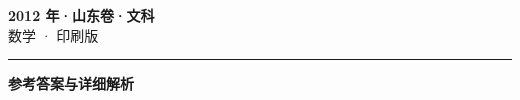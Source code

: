 \documentclass[zihao=5, a4paper]{ctexart}
\begin{document}
\begin{center}
  {\Large\bfseries 2012 年·山东卷·文科}\\[4pt]
  {\large 数学 · 印刷版}
\end{center}
\medskip
{}

\par\bigskip\hrule\bigskip
{}
\Needspace{0.55\textheight}
\begin{center}{\large\bfseries 参考答案与详细解析}\end{center}
\smallskip

\end{document}
